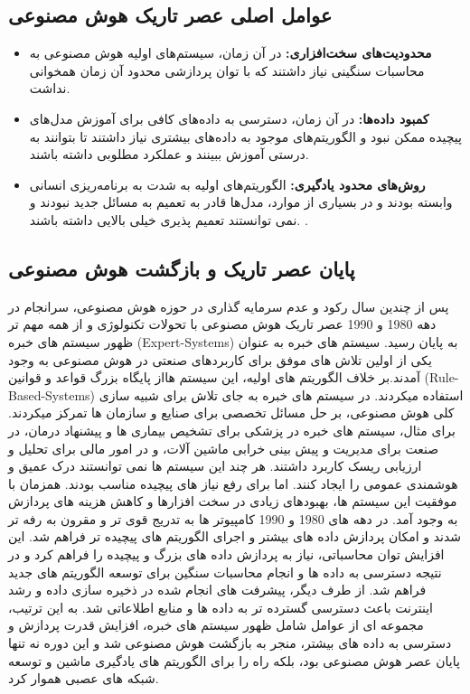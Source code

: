 \subsection{عوامل اصلی عصر تاریک هوش مصنوعی}
\begin{itemize}
	\item \textbf{محدودیت‌های سخت‌افزاری:}
در آن زمان، سیستم‌های اولیه هوش مصنوعی  به محاسبات سنگینی نیاز داشتند که با توان پردازشی محدود آن زمان همخوانی نداشت.
	
	\item \textbf{کمبود داده‌ها:}
 در آن زمان، دسترسی به داده‌های کافی برای آموزش مدل‌های پیچیده ممکن نبود و الگوریتم‌های موجود به داده‌های بیشتری نیاز داشتند تا بتوانند به درستی آموزش ببینند و عملکرد مطلوبی داشته باشند.
	
	\item \textbf{روش‌های محدود یادگیری:} 
الگوریتم‌های اولیه به شدت به برنامه‌ریزی انسانی وابسته بودند و در بسیاری از موارد، مدل‌ها قادر به تعمیم به مسائل جدید نبودند و نمی توانستند تعمیم پذیری خیلی بالایی داشته باشند. \cite{russell2016artificial}.
	\end{itemize}

\subsection{پایان عصر تاریک و بازگشت هوش مصنوعی}
پس از چندین سال رکود و عدم سرمایه گذاری در حوزه هوش مصنوعی، سرانجام در دهه 1980 و 1990  عصر تاریک هوش مصنوعی با تحولات تکنولوژی و از همه مهم تر ظهور سیستم های خبره
(Expert-Systems)
به پایان رسید.
سیستم های خبره به عنوان یکی از اولین تلاش های موفق برای کاربردهای صنعتی در هوش مصنوعی به وجود آمدند.بر خلاف الگوریتم های اولیه، این سیستم هااز پایگاه بزرگ قواعد و قوانین 
(Rule-Based-Systems) 
استفاده میکردند. 
در سیستم های خبره به جای تلاش برای شبیه سازی کلی هوش مصنوعی، بر حل مسائل تخصصی برای صنایع و سازمان ها تمرکز میکردند. برای مثال، سیستم های خبره در پزشکی برای تشخیص بیماری ها و پیشنهاد درمان، در صنعت برای مدیریت و پیش بینی خرابی ماشین آلات، و در امور مالی برای تحلیل و ارزیابی ریسک کاربرد داشتند.
هر چند این سیستم ها نمی توانستند درک عمیق و هوشمندی عمومی را ایجاد کنند. اما برای رفع نیاز های پیچیده مناسب بودند.
همزمان با موفقیت این سیستم ها، بهبودهای زیادی در سخت افزارها و کاهش هزینه های پردازش به وجود آمد. در دهه های 1980  و 1990 کامپیوتر ها به تدریج قوی تر و مقرون به رفه تر شدند و امکان پردازش داده های بیشتر و اجرای الگوریتم های پیچیده تر فراهم شد.
این افزایش توان محاسباتی، نیاز به پردازش داده های بزرگ و پیچیده را فراهم کرد و در نتیجه دسترسی به داده ها و انجام محاسبات سنگین برای توسعه الگوریتم های جدید فراهم شد.
از طرف دیگر، پیشرفت های انجام شده در ذخیره سازی داده و رشد اینترنت باعث دسترسی گسترده تر به داده ها و منابع اطلاعاتی شد.
به این ترتیب، مجموعه ای از عوامل شامل ظهور سیستم های خبره، افزایش قدرت پردازش و دسترسی به داده های بیشتر، منجر به بازگشت هوش مصنوعی شد و این دوره نه تنها پایان عصر هوش مصنوعی بود، بلکه راه را برای الگوریتم های یادگیری ماشین و توسعه شبکه های عصبی هموار کرد. \cite{(McCorduck, 2004; Russell & Norvig, 2016).}


